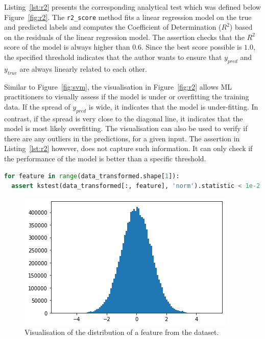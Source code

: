 \documentclass[conference]{IEEEtran}
\begin{document}
Listing~\ref{lst:r2} presents the corresponding analytical test which was defined below Figure~\ref{fig:r2}. The \texttt{r2\_score} method fits a linear regression model on the true and predicted labels and computes the Coefficient of Determination ($R^2$) based on the residuals of the linear regression model. The assertion checks that the $R^2$ score of the model is always higher than $0.6$. Since the best score possible is $1.0$, the specified threshold indicates that the author wants to ensure that $y_{pred}$ and $y_{true}$ are always linearly related to each other.

Similar to Figure~\ref{fig:svm}, the visualisation in Figure~\ref{fig:r2} allows ML practitioners to visually assess if the model is under or overfitting the training data. If the spread of $y_{pred}$ is wide, it indicates that the model is under-fitting. In contrast, if the spread is very close to the diagonal line, it indicates that the model is most likely overfitting. The visualisation can also be used to verify if there are any outliers in the predictions, for a given input. The assertion in Listing~\ref{lst:r2} however, does not capture such information. It can only check if the performance of the model is better than a specific threshold.

\begin{lstlisting}[language=Python, caption={Assertion to check that each feature in a dataset is normal. The distribution of each feature is compared to that of a normal distribution using the Kolmogorov-Smirnov test for goodness of fit from the scipy library.}, label={lst:kstest}]
for feature in range(data_transformed.shape[1]):
  assert kstest(data_transformed[:, feature], 'norm').statistic < 1e-2
\end{lstlisting}

\begin{figure}
  \includegraphics[width=\linewidth]{../catalogue/select-152a.png}
  \caption{Visualisation of the distribution of a feature from the dataset.}\label{fig:kstest}
\end{figure}
\end{document}
